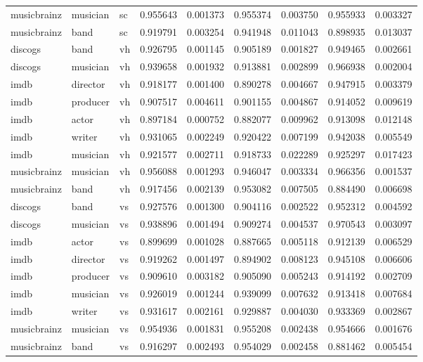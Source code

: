 \documentclass[epsfig,a4paper,11pt,titlepage,twoside,openany]{book}
\begin{document}
\begin{longtable}{|l|l|l|l|l|l|l|l|l|}
musicbrainz & musician & sc      & 0.955643 & 0.001373 & 0.955374  & 0.003750 & 0.955933    & 0.003327   \\
musicbrainz & band     & sc      & 0.919791 & 0.003254 & 0.941948  & 0.011043 & 0.898935    & 0.013037   \\ \hline
discogs     & band     & vh & 0.926795 & 0.001145 & 0.905189  & 0.001827 & 0.949465    & 0.002661   \\
discogs     & musician & vh & 0.939658 & 0.001932 & 0.913881  & 0.002899 & 0.966938    & 0.002004   \\
imdb        & director & vh & 0.918177 & 0.001400 & 0.890278  & 0.004667 & 0.947915    & 0.003379   \\
imdb        & producer & vh & 0.907517 & 0.004611 & 0.901155  & 0.004867 & 0.914052    & 0.009619   \\
imdb        & actor    & vh & 0.897184 & 0.000752 & 0.882077  & 0.009962 & 0.913098    & 0.012148   \\
imdb        & writer   & vh & 0.931065 & 0.002249 & 0.920422  & 0.007199 & 0.942038    & 0.005549   \\
imdb        & musician & vh & 0.921577 & 0.002711 & 0.918733  & 0.022289 & 0.925297    & 0.017423   \\
musicbrainz & musician & vh & 0.956088 & 0.001293 & 0.946047  & 0.003334 & 0.966356    & 0.001537   \\
musicbrainz & band     & vh & 0.917456 & 0.002139 & 0.953082  & 0.007505 & 0.884490    & 0.006698   \\ \hline
discogs     & band     & vs & 0.927576 & 0.001300 & 0.904116  & 0.002522 & 0.952312    & 0.004592   \\
discogs     & musician & vs & 0.938896 & 0.001494 & 0.909274  & 0.004537 & 0.970543    & 0.003097   \\
imdb        & actor    & vs & 0.899699 & 0.001028 & 0.887665  & 0.005118 & 0.912139    & 0.006529   \\
imdb        & director & vs & 0.919262 & 0.001497 & 0.894902  & 0.008123 & 0.945108    & 0.006606   \\
imdb        & producer & vs & 0.909610 & 0.003182 & 0.905090  & 0.005243 & 0.914192    & 0.002709   \\
imdb        & musician & vs & 0.926019 & 0.001244 & 0.939099  & 0.007632 & 0.913418    & 0.007684   \\
imdb        & writer   & vs & 0.931617 & 0.002161 & 0.929887  & 0.004030 & 0.933369    & 0.002867   \\
musicbrainz & musician & vs & 0.954936 & 0.001831 & 0.955208  & 0.002438 & 0.954666    & 0.001676   \\
musicbrainz & band     & vs & 0.916297 & 0.002493 & 0.954029  & 0.002458 & 0.881462    & 0.005454   \\ \hline
\end{longtable}
\end{document}
